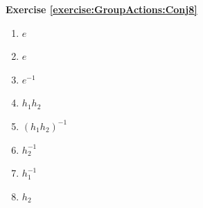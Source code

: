 \noindent\textbf{Exercise \ref{exercise:GroupActions:Conj8}}
%
%
\begin{multicols}{4}
\begin{enumerate}
\item
$e$

\item
$e$

\item
$e^{-1}$

\item
$h_1h_2$ 

\item
$(h_1h_2)^{-1}$

\item
$h_2^{-1}$

\item
$h_1^{-1}$

\item
$h_2$
\end{enumerate}
\end{multicols}

